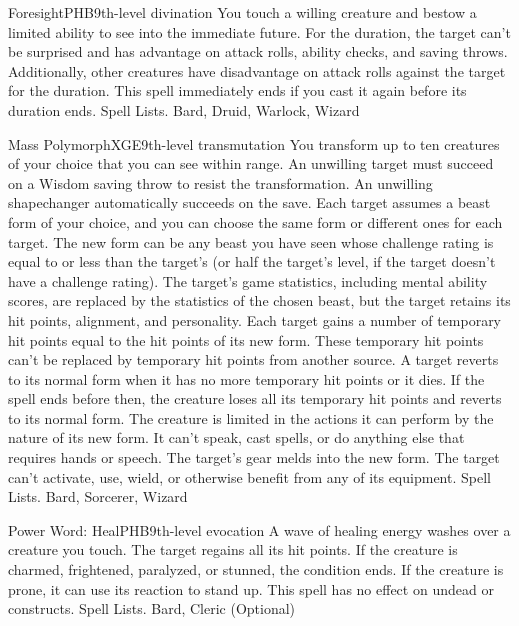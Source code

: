 \begin{spell}{Foresight}{PHB}{9th-level divination}
{
}
You touch a willing creature and bestow a limited ability to see into the immediate future. For the duration, the target can’t be surprised and has advantage on attack rolls, ability checks, and saving throws. Additionally, other creatures have disadvantage on attack rolls against the target for the duration. This spell immediately ends if you cast it again before its duration ends.
Spell Lists. Bard, Druid, Warlock, Wizard
\end{spell}

\begin{spell}{Mass Polymorph}{XGE}{9th-level transmutation}
{
}
You transform up to ten creatures of your choice that you can see within range. An unwilling target must succeed on a Wisdom saving throw to resist the transformation. An unwilling shapechanger automatically succeeds on the save.
Each target assumes a beast form of your choice, and you can choose the same form or different ones for each target. The new form can be any beast you have seen whose challenge rating is equal to or less than the target’s (or half the target’s level, if the target doesn’t have a challenge rating). The target’s game statistics, including mental ability scores, are replaced by the statistics of the chosen beast, but the target retains its hit points, alignment, and personality.
Each target gains a number of temporary hit points equal to the hit points of its new form. These temporary hit points can’t be replaced by temporary hit points from another source. A target reverts to its normal form when it has no more temporary hit points or it dies. If the spell ends before then, the creature loses all its temporary hit points and reverts to its normal form.
The creature is limited in the actions it can perform by the nature of its new form. It can’t speak, cast spells, or do anything else that requires hands or speech. The target’s gear melds into the new form.
The target can’t activate, use, wield, or otherwise benefit from any of its equipment.
Spell Lists. Bard, Sorcerer, Wizard
\end{spell}

\begin{spell}{Power Word: Heal}{PHB}{9th-level evocation}
{
}
A wave of healing energy washes over a creature you touch. The target regains all its hit points. If the creature is charmed, frightened, paralyzed, or stunned, the condition ends. If the creature is prone, it can use its reaction to stand up. This spell has no effect on undead or constructs.
Spell Lists. Bard, Cleric (Optional)
\end{spell}

